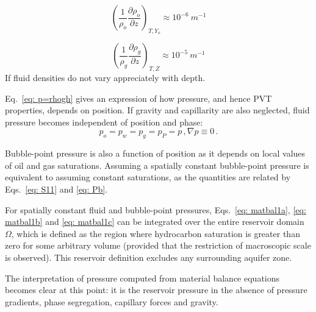 \documentclass[authoryear,preprint,review,12pt]{elsarticle}
\begin{document}
\begin{equation}
\left(\frac{1}{\rho_o}\frac{\partial \rho_o}{\partial z}\right)_{T,Y_o} \approx 10^{-6}\ m^{-1}
\end{equation}

\begin{equation}
\left(\frac{1}{\rho_g}\frac{\partial \rho_g}{\partial z}\right)_{T,Z} \approx 10^{-5}\ m^{-1}
\end{equation}
If fluid densities do not vary appreciately with depth.


Eq.~\eqref{eq: p=rhogh} gives an expression of how pressure, and hence PVT properties, depends on position. If gravity and capillarity are also neglected, fluid pressure becomes independent of position and phase:
\begin{subequations}\label{eq: fullsimp}
\begin{equation}
p_o=p_w=p_g=p_P=p \, ,
\end{equation}
\begin{equation}
\nabla p \equiv 0 \, .
\end{equation}
\end{subequations}

Bubble-point pressure is also a function of position as it depends on local values of oil and gas saturations. Assuming a spatially constant bubble-point pressure is equivalent to assuming constant saturations, as the quantities are related by Eqs.~\eqref{eq: S11} and \eqref{eq: Pb}.


For spatially constant fluid and bubble-point pressures, Eqs.~\eqref{eq: matbal1a}, \eqref{eq: matbal1b} and \eqref{eq: matbal1c} can be integrated over the entire reservoir domain $\Omega$, which is defined as the region where hydrocarbon saturation is greater than zero for some arbitrary volume (provided that the restriction of macroscopic scale is observed). This reservoir definition excludes any surrounding aquifer zone.

The interpretation of pressure computed from material balance equations becomes clear at this point: it is the reservoir pressure in the absence of pressure gradients, phase segregation, capillary forces and gravity.
\end{document}
